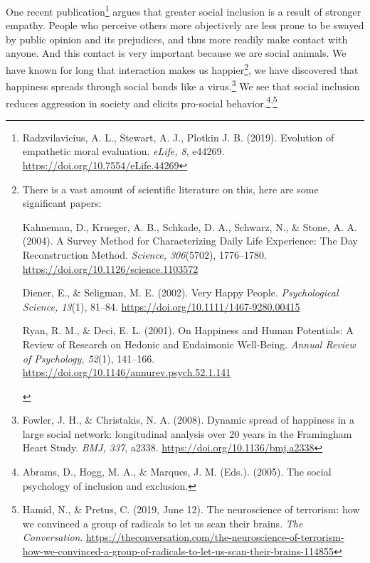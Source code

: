 \documentclass[12pt]{report}
\begin{document}
\noindent One recent publication\footnote{Radzvilavicius, A. L., Stewart, A. J., Plotkin J. B. (2019). Evolution of empathetic moral evaluation. \emph{eLife, 8}, e44269. \url{https://doi.org/10.7554/eLife.44269}} argues that greater social inclusion is a result of stronger empathy. People who perceive others more objectively are less prone to be swayed by public opinion and its prejudices, and thus more readily make contact with anyone. And this contact is very important because we are social animals. We have known for long that interaction makes us happier\footnote{There is a vast amount of scientific literature on this, here are some significant papers:
\begin{compactitem}
  \item Kahneman, D., Krueger, A. B., Schkade, D. A., Schwarz, N., \& Stone, A. A. (2004). A Survey Method for Characterizing Daily Life Experience: The Day Reconstruction Method. \emph{Science, 306}(5702), 1776–1780. \url{https://doi.org/10.1126/science.1103572}
  \item Diener, E., \& Seligman, M. E. (2002). Very Happy People. \emph{Psychological Science, 13}(1), 81–84. \url{https://doi.org/10.1111/1467-9280.00415}
  \item Ryan, R. M., \& Deci, E. L. (2001). On Happiness and Human Potentials: A Review of Research on Hedonic and Eudaimonic Well-Being. \emph{Annual Review of Psychology, 52}(1), 141–166. \url{https://doi.org/10.1146/annurev.psych.52.1.141}
\end{compactitem}\vspace{-1.3em}}, we have discovered that happiness spreads through social bonds like a virus.\footnote{Fowler, J. H., \& Christakis, N. A. (2008). Dynamic spread of happiness in a large social network: longitudinal analysis over 20 years in the Framingham Heart Study. \emph{BMJ, 337}, a2338. \url{https://doi.org/10.1136/bmj.a2338}} We see that social inclusion reduces aggression in society and elicits pro-social behavior.\footnote{Abrams, D., Hogg, M. A., \& Marques, J. M. (Eds.). (2005). The social psychology of inclusion and exclusion.}\textsuperscript{,}\footnote{Hamid, N., \& Pretus, C. (2019, June 12). The neuroscience of terrorism: how we convinced a group of radicals to let us scan their brains. \emph{The Conversation}. \url{https://theconversation.com/the-neuroscience-of-terrorism-how-we-convinced-a-group-of-radicals-to-let-us-scan-their-brains-114855}}
\end{document}
